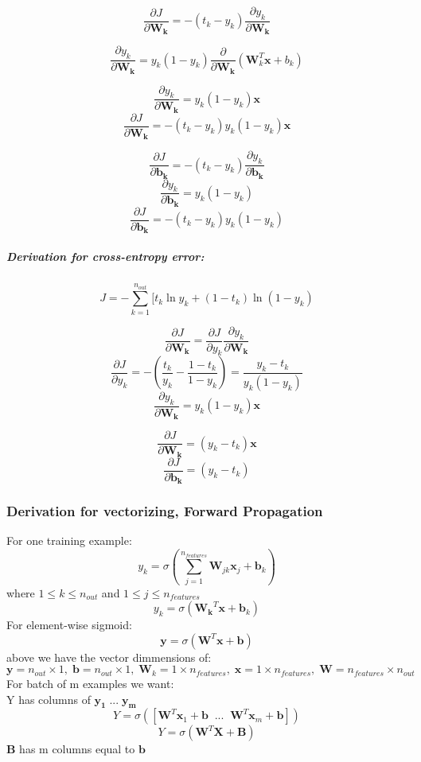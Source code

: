 \documentclass{article}
\begin{document}
$$\dfrac{\partial{J}}{\partial{\mathbf{W_k}}} = -(t_k - y_k) \dfrac{\partial{y_k}}{\partial{\mathbf{W_k}}}$$

$$\dfrac{\partial{y_k}}{\partial{\mathbf{W_k}}} = y_k(1 - y_k)\dfrac{\partial}{\partial{\mathbf{W_k}}}(\mathbf{W}_k^T \mathbf{x} + b_k)$$

$$\dfrac{\partial{y_k}}{\partial{\mathbf{W_k}}} = y_k(1 - y_k)\mathbf{x}$$
$$\dfrac{\partial{J}}{\partial{\mathbf{W_k}}} = -(t_k - y_k)y_k(1 - y_k)\mathbf{x}$$


$$\dfrac{\partial{J}}{\partial{\mathbf{b_k}}} = -(t_k - y_k) \dfrac{\partial{y_k}}{\partial{\mathbf{b_k}}}$$
$$\dfrac{\partial{y_k}}{\partial{\mathbf{b_k}}} = y_k(1 - y_k)$$
$$\dfrac{\partial{J}}{\partial{\mathbf{b_k}}} = -(t_k - y_k)y_k(1 - y_k)$$

\subparagraph{Derivation for cross-entropy error:}
$$J = -\sum_{k=1}^{n_{out}}[t_k \ln{y_k} + (1-t_k)\ln{(1-y_k)}$$

$$\dfrac{\partial{J}}{\partial{\mathbf{W_k}}} = \dfrac{\partial{J}}{\partial{y_k}} \dfrac{\partial{y_k}}{\partial{\mathbf{W_k}}}$$
$$\dfrac{\partial{J}}{\partial{y_k}} = -(\frac{t_k}{y_k} - \frac{1 - t_k}{1 - y_k}) = \frac{y_k - t_k}{y_k (1 - y_k)}$$
$$\dfrac{\partial{y_k}}{\partial{\mathbf{W_k}}} = y_k (1 - y_k) \mathbf{x}$$

$$\dfrac{\partial{J}}{\partial{\mathbf{W_k}}} = (y_k - t_k) \mathbf{x}$$
$$\dfrac{\partial{J}}{\partial{\mathbf{b_k}}} = (y_k - t_k)$$

\subsubsection*{Derivation for vectorizing, Forward Propagation}
For one training example:
$$y_k = {\sigma}(\sum_{j=1}^{n_{features}}{\mathbf{W}_{jk}}\mathbf{x}_j + {\mathbf{b}_k})$$
where $1\leq k \leq n_{out}$ and $1 \leq j \leq n_{features}$
$$y_k = \sigma(\mathbf{W_k}^T\mathbf{x} + {\mathbf{b}_k})$$
For element-wise sigmoid:
$$\mathbf{y} = \sigma(\mathbf{W}^T\mathbf{x} + \mathbf{b})$$
above we have the vector dimmensions of:
$$\mathbf{y} = n_{out}\times 1, \; \mathbf{b} = n_{out}\times 1, \;  \mathbf{W}_k = 1\times n_{features}, \; \mathbf{x} = 1\times n_{features}, \; \mathbf{W}=n_{features}\times n_{out}$$
For batch of m examples we want:\\
Y has columns of $\mathbf{y_1} \; ... \; \mathbf{y_m}$
$$Y = \sigma ([\mathbf{W}^T\mathbf{x}_1+\mathbf{b} \; \; ... \; \; \mathbf{W}^T\mathbf{x}_m + \mathbf{b}])$$
$$Y = \sigma(\mathbf{W}^T\mathbf{X} + \mathbf{B})$$
$\mathbf{B}$ has m columns equal to $\mathbf{b}$
\end{document}
